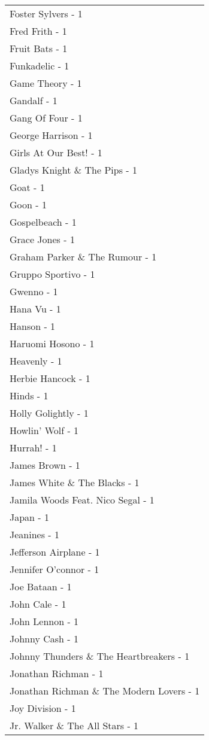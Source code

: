 \documentclass[
]{article}
\begin{document}
\begin{longtable}{l}
Foster Sylvers - 1 \\ 
Fred Frith - 1 \\ 
Fruit Bats - 1 \\ 
Funkadelic - 1 \\ 
Game Theory - 1 \\ 
Gandalf - 1 \\ 
Gang Of Four - 1 \\ 
George Harrison - 1 \\ 
Girls At Our Best! - 1 \\ 
Gladys Knight \& The Pips - 1 \\ 
Goat - 1 \\ 
Goon - 1 \\ 
Gospelbeach - 1 \\ 
Grace Jones - 1 \\ 
Graham Parker \& The Rumour - 1 \\ 
Gruppo Sportivo - 1 \\ 
Gwenno - 1 \\ 
Hana Vu - 1 \\ 
Hanson - 1 \\ 
Haruomi Hosono - 1 \\ 
Heavenly - 1 \\ 
Herbie Hancock - 1 \\ 
Hinds - 1 \\ 
Holly Golightly - 1 \\ 
Howlin' Wolf - 1 \\ 
Hurrah! - 1 \\ 
James Brown - 1 \\ 
James White \& The Blacks - 1 \\ 
Jamila Woods Feat. Nico Segal - 1 \\ 
Japan - 1 \\ 
Jeanines - 1 \\ 
Jefferson Airplane - 1 \\ 
Jennifer O'connor - 1 \\ 
Joe Bataan - 1 \\ 
John Cale - 1 \\ 
John Lennon - 1 \\ 
Johnny Cash - 1 \\ 
Johnny Thunders \& The Heartbreakers - 1 \\ 
Jonathan Richman - 1 \\ 
Jonathan Richman \& The Modern Lovers - 1 \\ 
Joy Division - 1 \\ 
Jr. Walker \& The All Stars - 1 \\ 

\end{longtable}
\end{document}

